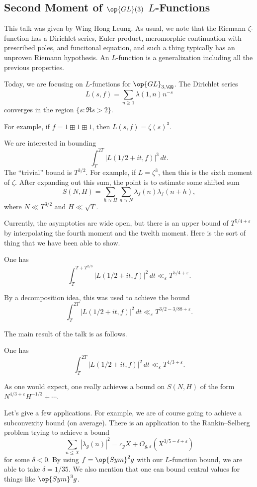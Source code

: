 \documentclass{article}
\begin{document}
\subsection{Second Moment of \texorpdfstring{$\op{GL}(3)$ $L$-}{ GL(3) of L-}Functions}
This talk was given by Wing Hong Leung. As usual, we note that the Riemann $\zeta$-function has a Dirichlet series, Euler product, meromorphic continuation with prescribed poles, and funcitonal equation, and such a thing typically has an unproven Riemann hypothesis. An $L$-function is a generalization including all the previous properties.

Today, we are focusing on $L$-functions for $\op{GL}_{3,\QQ}$. The Dirichlet series
\[L(s,f)=\sum_{n\ge1}\lambda(1,n)n^{-s}\]
converges in the region $\{s:\Re s>2\}$.
\begin{example}
	For example, if $f=1\boxplus1\boxplus1$, then $L(s,f)=\zeta(s)^3$. 
\end{example}
We are interested in bounding
\[\int_T^{2T}\left|L(1/2+it,f)\right|^3\,dt.\]
The ``trivial'' bound is $T^{3/2}$. For example, if $L=\zeta^3$, then this is the sixth moment of $\zeta$. After expanding out this sum, the point is to estimate some shifted sum
\[S(N,H)=\sum_{h\approx H}\sum_{n\approx N}\lambda_f(n)\lambda_f(n+h),\]
where $N\ll T^{3/2}$ and $H\ll\sqrt T$.

Currently, the asymptotics are wide open, but there is an upper bound of $T^{5/4+\varepsilon}$ by interpolating the fourth moment and the twelth moment. Here is the sort of thing that we have been able to show.
\begin{theorem}
	One has
	\[\int_T^{T+T^{2/3}}\left|L(1/2+it,f)\right|^2\,dt\ll_\varepsilon T^{5/4+\varepsilon}.\]
\end{theorem}
\begin{remark}
	By a decomposition idea, this was used to achieve the bound
	\[\int_T^{2T}\left|L(1/2+it,f)\right|^2\,dt\ll_\varepsilon T^{3/2-3/88+\varepsilon}.\]
\end{remark}
The main result of the talk is as follows.
\begin{theorem}
	One has
	\[\int_T^{2T}\left|L(1/2+it,f)\right|^2\,dt\ll_\varepsilon T^{4/3+\varepsilon}.\]
\end{theorem}
As one would expect, one really achieves a bound on $S(N,H)$ of the form $N^{4/3+\varepsilon}H^{-1/3}+\cdots$.

Let's give a few applications. For example, we are of course going to achieve a subconvexity bound (on average). There is an application to the Rankin--Selberg problem trying to achieve a bound
\[\sum_{n\le X}\left|\lambda_g(n)\right|^2=c_gX+O_{g,\varepsilon}\left(X^{3/5-\delta+\varepsilon}\right)\]
for some $\delta<0$. By using $f=\op{Sym}^2g$ with our $L$-function bound, we are able to take $\delta=1/35$.
We also mention that one can bound central values for things like $\op{Sym}^3g$.
\end{document}
